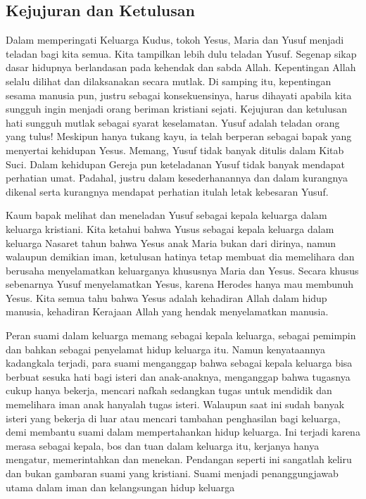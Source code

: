 \documentclass[12pt,a4paper]{article}
\begin{document}
\subsection*{Kejujuran dan Ketulusan}
Dalam memperingati Keluarga Kudus, tokoh Yesus, Maria dan Yusuf menjadi teladan bagi kita semua. Kita tampilkan lebih dulu teladan Yusuf. Segenap sikap dasar hidupnya berlandasan pada kehendak dan sabda Allah. Kepentingan Allah selalu dilihat dan dilaksanakan secara mutlak. Di samping itu, kepentingan sesama manusia pun, justru sebagai konsekuensinya, harus dihayati apabila kita sungguh ingin menjadi orang beriman kristiani sejati. Kejujuran dan ketulusan hati sungguh mutlak sebagai syarat keselamatan. Yusuf adalah teladan orang yang tulus! Meskipun hanya tukang kayu, ia telah berperan sebagai bapak yang menyertai kehidupan Yesus. Memang, Yusuf tidak banyak ditulis dalam Kitab Suci. Dalam kehidupan Gereja pun keteladanan Yusuf tidak banyak mendapat perhatian umat. Padahal, justru dalam kesederhanannya dan dalam kurangnya dikenal serta kurangnya mendapat perhatian itulah letak kebesaran Yusuf. 

Kaum bapak melihat dan meneladan Yusuf sebagai kepala keluarga dalam keluarga kristiani. Kita ketahui bahwa Yusus sebagai kepala keluarga dalam keluarga Nasaret tahun bahwa Yesus anak Maria bukan dari dirinya, namun walaupun demikian iman, ketulusan hatinya tetap membuat dia memelihara dan berusaha menyelamatkan keluarganya khususnya Maria dan Yesus. Secara khusus sebenarnya Yusuf menyelamatkan Yesus, karena Herodes hanya mau membunuh Yesus. Kita semua tahu bahwa Yesus adalah kehadiran Allah dalam hidup manusia, kehadiran Kerajaan Allah yang hendak menyelamatkan manusia.

Peran suami dalam keluarga memang sebagai kepala keluarga, sebagai pemimpin dan bahkan sebagai penyelamat hidup keluarga itu. Namun kenyataannya kadangkala terjadi, para suami menganggap bahwa sebagai kepala keluarga bisa berbuat sesuka hati bagi isteri dan anak-anaknya, menganggap bahwa tugasnya cukup hanya bekerja, mencari nafkah sedangkan tugas untuk mendidik dan memelihara iman anak hanyalah tugas isteri. Walaupun saat ini sudah banyak isteri yang bekerja di luar atau mencari tambahan penghasilan bagi keluarga, demi membantu suami dalam mempertahankan hidup keluarga. Ini terjadi karena merasa sebagai kepala, bos dan tuan dalam keluarga itu, kerjanya hanya mengatur, memerintahkan dan menekan. Pendangan seperti ini sangatlah keliru dan bukan gambaran suami yang kristiani. Suami menjadi penanggungjawab utama dalam iman dan kelangsungan hidup keluarga
\end{document}
